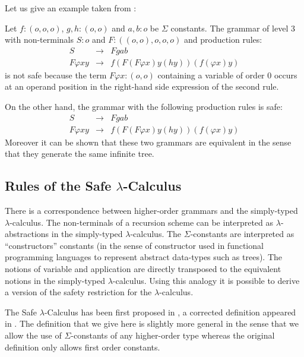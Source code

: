 Let us give an example taken from \cite{KNU02}:
\begin{exmp} Let $f:(o,o,o)$, $g,h:(o,o)$ and $a,b:o$ be $\Sigma$ constants.
 The grammar of level 3 with non-terminals $S:o$ and $F: ((o,o),o,o,o)$ and production rules:
\begin{eqnarray*}
    S &\rightarrow&  F g a b \\
    F \varphi x y &\rightarrow& f ( F ( F \varphi x ) y (h y)) (f (\varphi x) y)
\end{eqnarray*}
is not safe because the term $F \varphi x : (o,o)$ containing a variable of order $0$
occurs at an operand position in the right-hand side expression of the second rule.

On the other hand, the grammar with the following production rules is safe:
\begin{eqnarray*}
    S &\rightarrow&  F g a b \\
    F \varphi x y &\rightarrow& f ( F ( F \varphi x ) y (h y)) (f (\varphi x) y)
\end{eqnarray*}
Moreover it can be shown that these two grammars are equivalent in the sense that they generate the same
infinite tree.
\end{exmp}


\subsection{Rules of the Safe $\lambda$-Calculus}

There is a correspondence between higher-order grammars and the simply-typed $\lambda$-calculus. The non-terminals of a recursion scheme can be interpreted as $\lambda$-abstractions in the
simply-typed $\lambda$-calculus. The $\Sigma$-constants are
interpreted as ``constructors'' constants (in the sense of
constructor used in functional programming languages to represent
abstract data-types such as trees). The notions of variable and
application are directly transposed to the equivalent notions in the
simply-typed $\lambda$-calculus. Using this analogy it is possible
to derive a version of the safety restriction for the
$\lambda$-calculus.

The Safe $\lambda$-Calculus has been first proposed in
\cite{DBLP:conf/fossacs/AehligMO05}, a corrected definition appeared
in \cite{Ong2005}. The definition that we give here is slightly more
general in the sense that we allow the use of $\Sigma$-constants of
any higher-order type whereas the original definition only allows
first order constants.


